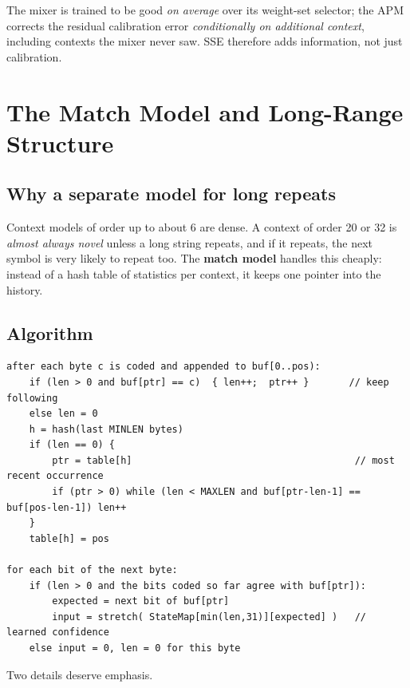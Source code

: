 \documentclass[11pt,a4paper,openany]{book}
\theoremstyle{definition}
\theoremstyle{remark}
\begin{document}
\begin{keyidea}
The mixer is trained to be good \emph{on average} over its weight-set selector; the APM corrects the residual calibration error \emph{conditionally on additional context}, including contexts the mixer never saw. SSE therefore adds information, not just calibration.
\end{keyidea}

\chapter{The Match Model and Long-Range Structure}

\section{Why a separate model for long repeats}

Context models of order up to about 6 are dense. A context of order 20 or 32 is \emph{almost always novel} unless a long string repeats, and if it repeats, the next symbol is very likely to repeat too. The \textbf{match model} handles this cheaply: instead of a hash table of statistics per context, it keeps one pointer into the history.

\section{Algorithm}

\begin{lstlisting}[style=pseudo]
after each byte c is coded and appended to buf[0..pos):
    if (len > 0 and buf[ptr] == c)  { len++;  ptr++ }       // keep following
    else len = 0
    h = hash(last MINLEN bytes)
    if (len == 0) {
        ptr = table[h]                                       // most recent occurrence
        if (ptr > 0) while (len < MAXLEN and buf[ptr-len-1] == buf[pos-len-1]) len++
    }
    table[h] = pos

for each bit of the next byte:
    if (len > 0 and the bits coded so far agree with buf[ptr]):
        expected = next bit of buf[ptr]
        input = stretch( StateMap[min(len,31)][expected] )   // learned confidence
    else input = 0, len = 0 for this byte
\end{lstlisting}

Two details deserve emphasis.
\end{document}
